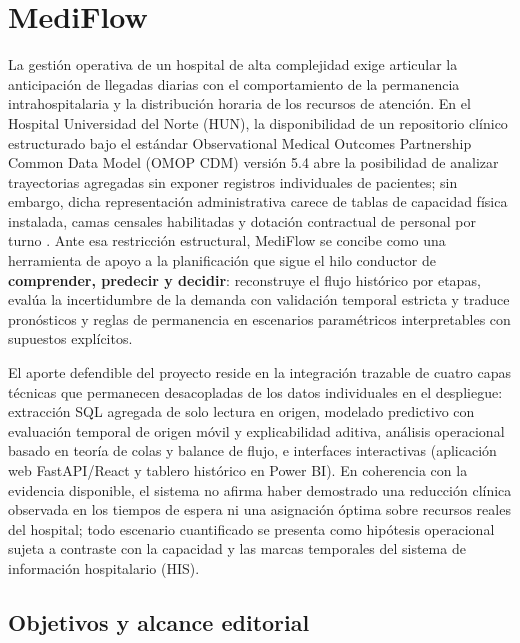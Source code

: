 
\section{MediFlow}

La gestión operativa de un hospital de alta complejidad exige articular la anticipación de llegadas diarias con el comportamiento de la permanencia intrahospitalaria y la distribución horaria de los recursos de atención. En el Hospital Universidad del Norte (HUN), la disponibilidad de un repositorio clínico estructurado bajo el estándar Observational Medical Outcomes Partnership Common Data Model (OMOP CDM) versión 5.4 \parencite{ohdsi54} abre la posibilidad de analizar trayectorias agregadas sin exponer registros individuales de pacientes; sin embargo, dicha representación administrativa carece de tablas de capacidad física instalada, camas censales habilitadas y dotación contractual de personal por turno \parencite{mediflow2026informe}. Ante esa restricción estructural, MediFlow se concibe como una herramienta de apoyo a la planificación que sigue el hilo conductor de \textbf{comprender, predecir y decidir}: reconstruye el flujo histórico por etapas, evalúa la incertidumbre de la demanda con validación temporal estricta y traduce pronósticos y reglas de permanencia en escenarios paramétricos interpretables con supuestos explícitos.

El aporte defendible del proyecto reside en la integración trazable de cuatro capas técnicas que permanecen desacopladas de los datos individuales en el despliegue: extracción SQL agregada de solo lectura en origen, modelado predictivo con evaluación temporal de origen móvil y explicabilidad aditiva, análisis operacional basado en teoría de colas y balance de flujo, e interfaces interactivas (aplicación web FastAPI/React y tablero histórico en Power BI). En coherencia con la evidencia disponible, el sistema no afirma haber demostrado una reducción clínica observada en los tiempos de espera ni una asignación óptima sobre recursos reales del hospital; todo escenario cuantificado se presenta como hipótesis operacional sujeta a contraste con la capacidad y las marcas temporales del sistema de información hospitalario (HIS).

\subsection{Objetivos y alcance editorial}

